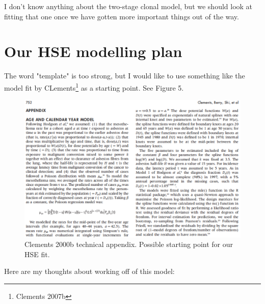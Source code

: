 \documentclass{article}\usepackage{graphicx, color}
\begin{document}
I don't know anything about the two-stage clonal model, but we should look at fitting that one once we have gotten more important things out of the way.


\section{Our HSE modelling plan}

The word "template" is too strong, but I would like to use something like the model fit by CLements\footnote{Clements 2007b} as a starting point.  See Figure 5. 

\begin{figure}[h!]
  \centering
    \includegraphics[width=6in]{Clements_technical_appendix}
      \caption{Clements 2000b technical appendix.  Possible starting point for our HSE fit.}
\end{figure}

Here are my thoughts about working off of this model:
\end{document}
